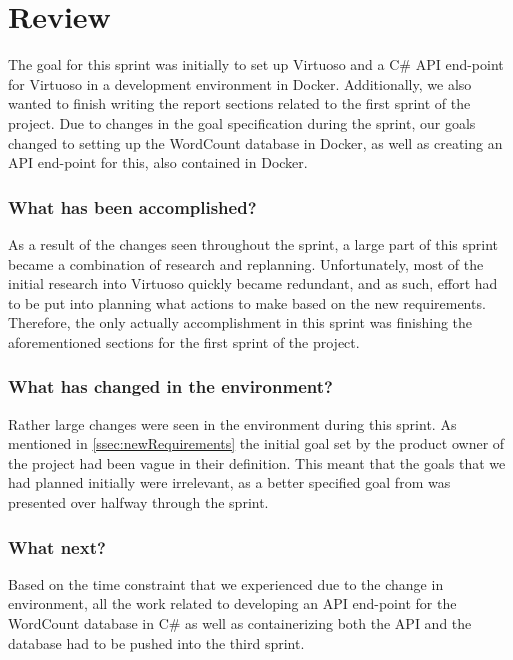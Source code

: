 \section{Review}
The goal for this sprint was initially to set up Virtuoso and a C\# API end-point for Virtuoso in a development environment in Docker. Additionally, we also wanted to finish writing the report sections related to the first sprint of the \knox{} project. Due to changes in the goal specification during the sprint, our goals changed to setting up the WordCount database in Docker, as well as creating an API end-point for this, also contained in Docker.

\subsubsection*{What has been accomplished?}
As a result of the changes seen throughout the sprint, a large part of this sprint became a combination of research and replanning. Unfortunately, most of the initial research into Virtuoso quickly became redundant, and as such, effort had to be put into planning what actions to make based on the new requirements. Therefore, the only actually accomplishment in this sprint was finishing the aforementioned sections for the first sprint of the \knox{} project.  

\subsubsection*{What has changed in the environment?}
Rather large changes were seen in the environment during this sprint. As mentioned in \ref{ssec:newRequirements} the initial goal set by the product owner of the \knox{} project had been vague in their definition. This meant that the goals that we had planned initially were irrelevant, as a better specified goal from \knox{} was presented over halfway through the sprint. 

\subsubsection*{What next?}
Based on the time constraint that we experienced due to the change in environment, all the work related to developing an API end-point for the WordCount database in C\# as well as containerizing both the API and the database had to be pushed into the third sprint.


